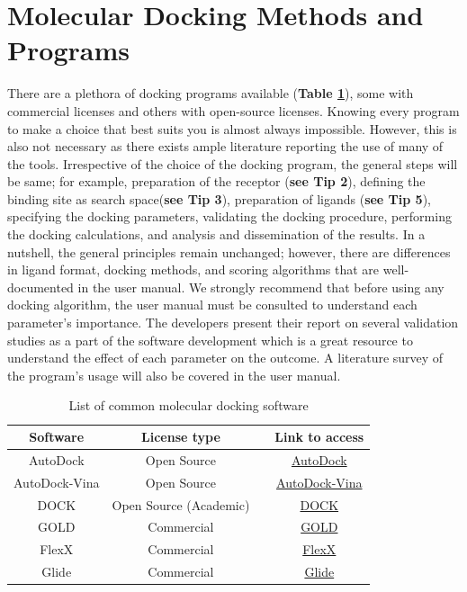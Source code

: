 \chapter*{Molecular Docking Methods and Programs}
There are a plethora of docking programs available (\textbf{Table \ref{tab:List}}), some with commercial licenses and others with open-source licenses. Knowing every program to make a choice that best suits you is almost always impossible. However, this is also not necessary as there exists ample literature reporting the use of many of the tools. Irrespective of the choice of the docking program, the general steps will be same; for example, preparation of the receptor (\textbf{see  Tip 2}), defining the binding site as search space(\textbf{see Tip 3}), preparation of ligands (\textbf{see Tip 5}), specifying the docking parameters, validating the docking procedure, performing the docking calculations, and analysis and dissemination of the results.  In a nutshell, the general principles remain unchanged; however, there are differences in ligand format, docking methods, and scoring algorithms that are well-documented in the user manual. We strongly recommend that before using any docking algorithm, the user manual must be consulted to understand each parameter's importance. The developers present their report on several validation studies as a part of the software development which is a great resource to understand the effect of each parameter on the outcome. A literature survey of the program's usage will also be covered in the user manual. 

\begin{table}[ht]
    \centering
    \caption{List of common molecular docking software}
    \label{tab:List}
    \begin{tabular}{|c|c|c|c|}
    \hline
         \textbf{Software} & \textbf{License type} & {\color{red}{\textbf{Scoring Function}}} & \textbf{Link to access} \\
    \hline
        AutoDock & Open Source & {\color{red}{Force field}} & \href{https://autodock.scripps.edu/download-autodock4/}{AutoDock}  \\
        AutoDock-Vina & Open Source &{\color{red}{Empirical}} & \href{https://github.com/ccsb-scripps/AutoDock-Vina/releases}{AutoDock-Vina}  \\
        DOCK & Open Source (Academic) & {\color{red}{Force field}}  & \href{https://dock.compbio.ucsf.edu}{DOCK}  \\
        GOLD &  Commercial & {\color{red}{Multiple options}} & \href{https://www.ccdc.cam.ac.uk/solutions/software/gold/}{GOLD} \\
        FlexX &  Commercial & {\color{red}{Empirical}}   & \href{https://www.biosolveit.de/products/#FlexX}{FlexX}  \\
        Glide &  Commercial & {\color{red}{Empirical}}  & \href{https://www.schrodinger.com/platform/products/glide/}{Glide} \\
    \hline
    \end{tabular}
\end{table}


